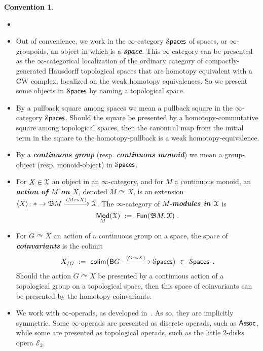 \documentclass{amsart}
\theoremstyle{definition}
\newtheorem*{conventions*}{Convention}
\theoremstyle{remark}
\DeclareMathOperator{\Mod}{\sf Mod}
\DeclareMathOperator{\colim}{{\sf colim}}
\DeclareMathOperator{\Fun}{{\sf Fun}}
\newcommand{\bit}[1]{\textbf{\textit{#1}}}
\newcommand{\lacts}{\curvearrowright}
\DeclareMathOperator{\Spaces}{\cS\mathsf{paces}}
\newcommand{\lag}{\langle}
\newcommand{\rag}{\rangle}
\newcommand{\xra}{\xrightarrow}
\def\cE{\mathcal E}\def\cF{\mathcal F}\def\cG{\mathcal G}\def\cH{\mathcal H}
\begin{document}
\begin{conventions*}
\begin{itemize}
\item[~]

\item
Out of convenience, we work in the $\infty$-category $\Spaces$ of spaces, or $\infty$-groupoids, an object in which is a \bit{space}.  
This $\infty$-category can be presented as the $\infty$-categorical localization of the ordinary category of compactly-generated Hausdorff topological spaces that are homotopy equivalent with a CW complex, localized on the weak homotopy equivalences.  
So we present some objects in $\Spaces$ by naming a topological space.  

\item
By a pullback square among spaces we mean a pullback square in the $\infty$-category $\Spaces$.
Should the square be presented by a homotopy-commutative square among topological spaces, then the canonical map from the initial term in the square to the homotopy-pullback is a weak homotopy-equivalence.  

\item
By a \bit{continuous group} (resp. \bit{continuous monoid}) we mean a group-object (resp. monoid-object) in $\Spaces$.

\item
For $X \in \mathcal X$ an object in an $\infty$-category, and for $M$ a continuous monoid, 
an \bit{action of $M$ on $X$}, denoted $M \lacts X$, is an extension
$
\lag X \rag 
\colon 
\ast 
\to 
\fB M 
\xra{ \lag M \lacts X \rag}
\cX
$.
The $\infty$-category of \bit{$M$-modules in $\mathcal X$} is
\[
\Mod_M(\cX)
~:=~
\Fun( \fB M , \cX)
~.
\]

\item
For $G\lacts X$ an action of a continuous group on a space, the space of \bit{coinvariants} is the colimit
\[
X_{/G}
~:=~
\colim\bigl(
\sB G
\xra{~\lag G \lacts X \rag~}
\Spaces
\bigr)
~\in~
\Spaces
~.
\]
Should the action $G\lacts X$ be presented by a continuous action of a topological group on a topological space, then this space of coinvariants can be presented by the homotopy-coinvariants.  

\item
We work with $\infty$-operads, as developed in~\cite{HA}.
As so, they are implicitly symmetric.
Some $\infty$-operads are presented as discrete operads, such as ${\sf Assoc}$, while some are presented as topological operads, such as the little 2-disks opera $\cE_2$.




\end{itemize}



\end{conventions*}
\end{document}
